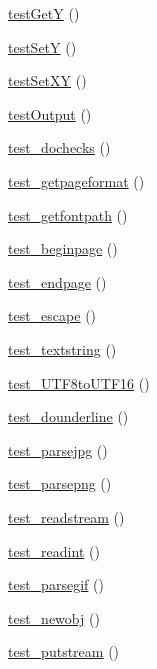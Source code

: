 \begin{DoxyCompactItemize}
\hyperlink{class_f_p_d_f_test_a202891a4bb198875c2e7d3b942e14cc7}{testGetY} ()
\item 
\hyperlink{class_f_p_d_f_test_a3aaf68edd4178eb4336cf21fa8d22c59}{testSetY} ()
\item 
\hyperlink{class_f_p_d_f_test_a92e4ef8f52821707b9434fda01be5107}{testSetXY} ()
\item 
\hyperlink{class_f_p_d_f_test_a586f5a4dbe45e0768ba5de87f8eb2ee7}{testOutput} ()
\item 
\hyperlink{class_f_p_d_f_test_a38916d65d0bd2d42f450e40a06d2af92}{test\_\-dochecks} ()
\item 
\hyperlink{class_f_p_d_f_test_a61571a1cdac74d176cf09b62f524a22f}{test\_\-getpageformat} ()
\item 
\hyperlink{class_f_p_d_f_test_a5e436f4b2f2a2d6c39aae8f5c7e8e17d}{test\_\-getfontpath} ()
\item 
\hyperlink{class_f_p_d_f_test_a6c3b14d6f82e5d93b646f7453274446e}{test\_\-beginpage} ()
\item 
\hyperlink{class_f_p_d_f_test_a4c7e35ee3eff1848468670a8fe0584f1}{test\_\-endpage} ()
\item 
\hyperlink{class_f_p_d_f_test_ae48297271d11e1d52a1384855b89d3e9}{test\_\-escape} ()
\item 
\hyperlink{class_f_p_d_f_test_a26334b369d05385e241f4a661a2ed72f}{test\_\-textstring} ()
\item 
\hyperlink{class_f_p_d_f_test_aaf523c46d6eed2b648c2f70ff27d34bf}{test\_\-UTF8toUTF16} ()
\item 
\hyperlink{class_f_p_d_f_test_aa9e63b7f51c85fcb5b6150026e7c4307}{test\_\-dounderline} ()
\item 
\hyperlink{class_f_p_d_f_test_adb9be70e47ea84877ba349e4e991232e}{test\_\-parsejpg} ()
\item 
\hyperlink{class_f_p_d_f_test_acb8f9e83c060ad33d3c2147af6d37f06}{test\_\-parsepng} ()
\item 
\hyperlink{class_f_p_d_f_test_afa1f3115925eb2bbe21999229e436ea4}{test\_\-readstream} ()
\item 
\hyperlink{class_f_p_d_f_test_ab8364fc0f5e8c885db9fa47d9681f92d}{test\_\-readint} ()
\item 
\hyperlink{class_f_p_d_f_test_af72e7607c068f8a80bda329a1b0e7159}{test\_\-parsegif} ()
\item 
\hyperlink{class_f_p_d_f_test_abbb3e91dda5b98c63b63c86840c9da28}{test\_\-newobj} ()
\item 
\hyperlink{class_f_p_d_f_test_af785ec3d8ea97c0aade2a69431d3a094}{test\_\-putstream} ()
\item 

\end{DoxyCompactItemize}

